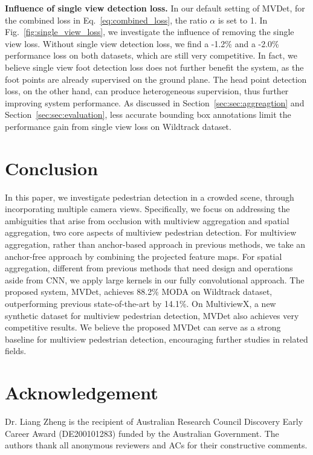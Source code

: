 \documentclass[runningheads]{llncs}
\begin{document}
\textbf{Influence of single view detection loss.} 
In our default setting of MVDet, for the combined loss in Eq.~\ref{eq:combined_loss}, the ratio $\alpha$ is set to 1. 
In Fig.~\ref{fig:single_view_loss}, we investigate the influence of removing the single view loss. 
Without single view detection loss, we find a -1.2\% and a -2.0\% performance loss on both datasets, which are still very competitive. In fact, we believe single view foot detection loss does not further benefit the system, as the foot points are already supervised on the ground plane. The head point detection loss, on the other hand, can produce heterogeneous supervision, thus further improving system performance. As discussed in Section~\ref{sec:sec:aggreagtion} and Section~\ref{sec:sec:evaluation}, less accurate bounding box annotations limit the performance gain from single view loss on Wildtrack dataset. 















\section{Conclusion}
In this paper, we investigate pedestrian detection in a crowded scene, through incorporating multiple camera views. Specifically, we focus on addressing the ambiguities that arise from occlusion with multiview aggregation and spatial aggregation, two core aspects of multiview pedestrian detection. For multiview aggregation, rather than anchor-based approach in previous methods, we take an anchor-free approach by combining the projected feature maps. For spatial aggregation, different from previous methods that need design and operations aside from CNN, we apply large kernels in our fully convolutional approach. 
The proposed system, MVDet, achieves 88.2\% MODA on Wildtrack dataset, outperforming previous state-of-the-art by 14.1\%. On MultiviewX, a new synthetic dataset for multiview pedestrian detection, MVDet also achieves very competitive results. We believe the proposed MVDet can serve as a strong baseline for multiview pedestrian detection, encouraging further studies in related fields.



\section*{Acknowledgement}
Dr. Liang Zheng is the recipient of Australian Research Council Discovery Early Career Award (DE200101283) funded by the Australian Government. The authors thank all anonymous reviewers and ACs for their constructive comments.















\end{document}

